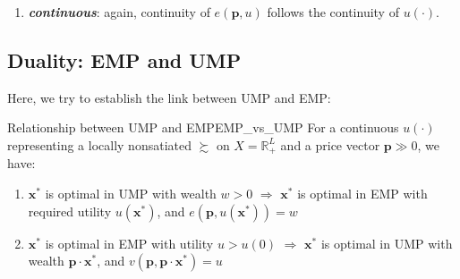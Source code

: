 \begin{enumerate}
    A graphic way of understanding the concavity of $e(\mathbf{p},u)$ w.r.t. $\mathbf{p}$ is: for any given $\bar{\mathbf{p}}$ and its EMP optimizer $\bar{\mathbf{x}}$, if prices changes while holding consumption fixed at $\bar{\mathbf{x}}$, the expenditure would be linear in $\mathbf{p}$: $\mathbf{p}\cdot\bar{\mathbf{x}}$. But by the nature of EMP, we know the expenditure function must be the minimum expenditure, i.e. $e(\mathbf{p},u)\leq p\cdot \bar{\mathbf{x}}$, hence the expenditure function lies under the straight line $\mathbf{p}\cdot\bar{\mathbf{x}}$ and touching it only at the EMP optimizers. And this has to be true for any $\mathbf{x}$, therefore, $e(\mathbf{p},u)$ is concave in $\mathbf{p}$ \citep[Figure 3.E.2, Page 60]{mas1995microeconomic}.
    \item \textit{\textbf{continuous}}: again, continuity of $e(\mathbf{p},u)$ follows the continuity of $u(\cdot)$.
\end{enumerate}

\subsection{Duality: EMP and UMP}
Here, we try to establish the link between UMP and EMP:
\begin{theorem}{Relationship between UMP and EMP}{EMP_vs_UMP}
    For a continuous $u(\cdot)$ representing a locally nonsatiated $\succsim$ on $X=\mathbb{R}^L_+$ and a price vector $\mathbf{p}\gg 0$, we have:
    \begin{enumerate}
        \item $\mathbf{x}^*$ is optimal in UMP with wealth $w>0$ $\Rightarrow$ $\mathbf{x}^*$ is optimal in EMP with required utility $u(\mathbf{x}^*)$, and $e(\mathbf{p},u(\mathbf{x}^*))=w$
        \item $\mathbf{x}^*$ is optimal in EMP with utility $u>u(0)$ $\Rightarrow$ $\mathbf{x}^*$ is optimal in UMP with wealth $\mathbf{p}\cdot\mathbf{x}^*$, and $v(\mathbf{p},\mathbf{p}\cdot\mathbf{x}^*)=u$
    \end{enumerate}
\end{theorem}

